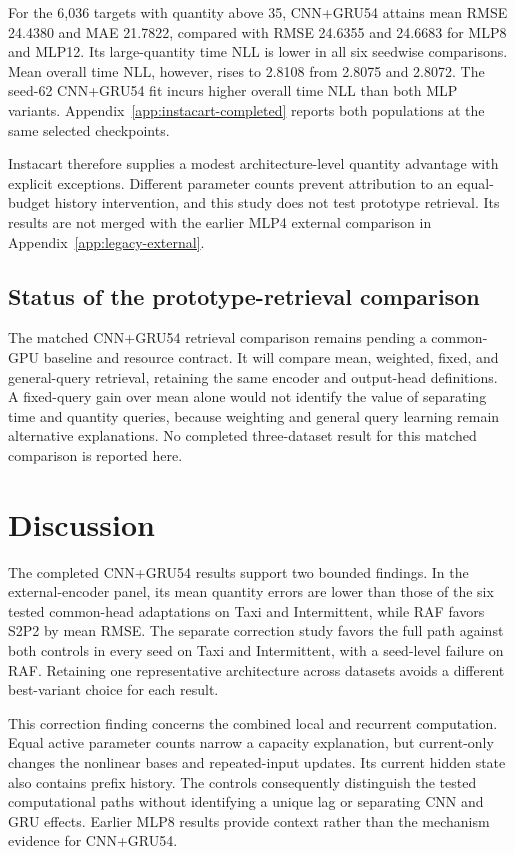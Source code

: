 \documentclass[runningheads]{llncs}
\begin{document}
For the 6,036 targets with quantity above 35, CNN+GRU54 attains mean RMSE 24.4380 and MAE 21.7822, compared with RMSE 24.6355 and 24.6683 for MLP8 and MLP12. Its large-quantity time NLL is lower in all six seedwise comparisons. Mean overall time NLL, however, rises to 2.8108 from 2.8075 and 2.8072. The seed-62 CNN+GRU54 fit incurs higher overall time NLL than both MLP variants. Appendix~\ref{app:instacart-completed} reports both populations at the same selected checkpoints.

Instacart therefore supplies a modest architecture-level quantity advantage with explicit exceptions. Different parameter counts prevent attribution to an equal-budget history intervention, and this study does not test prototype retrieval. Its results are not merged with the earlier MLP4 external comparison in Appendix~\ref{app:legacy-external}.

\subsection{Status of the prototype-retrieval comparison}
The matched CNN+GRU54 retrieval comparison remains pending a common-GPU baseline and resource contract. It will compare mean, weighted, fixed, and general-query retrieval, retaining the same encoder and output-head definitions. A fixed-query gain over mean alone would not identify the value of separating time and quantity queries, because weighting and general query learning remain alternative explanations. No completed three-dataset result for this matched comparison is reported here.

\section{Discussion}
The completed CNN+GRU54 results support two bounded findings. In the external-encoder panel, its mean quantity errors are lower than those of the six tested common-head adaptations on Taxi and Intermittent, while RAF favors S2P2 by mean RMSE. The separate correction study favors the full path against both controls in every seed on Taxi and Intermittent, with a seed-level failure on RAF. Retaining one representative architecture across datasets avoids a different best-variant choice for each result.

This correction finding concerns the combined local and recurrent computation. Equal active parameter counts narrow a capacity explanation, but current-only changes the nonlinear bases and repeated-input updates. Its current hidden state also contains prefix history. The controls consequently distinguish the tested computational paths without identifying a unique lag or separating CNN and GRU effects. Earlier MLP8 results provide context rather than the mechanism evidence for CNN+GRU54.
\end{document}
